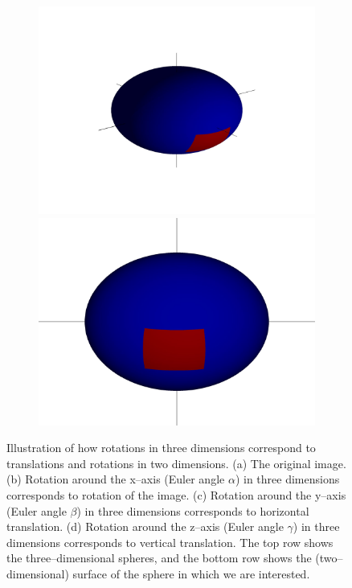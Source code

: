 \documentclass[11pt]{article}
\begin{document}
\begin{figure}
\begin{subfigure}{0.2\textwidth}
\caption{}
\end{subfigure}
\begin{subfigure}{0.2\textwidth}
\includegraphics[width=\textwidth]{sphere_4}
\includegraphics[width=\textwidth]{sphere2_4}
\caption{}
\end{subfigure}
\caption{Illustration of how rotations in three dimensions correspond to translations and rotations in two dimensions. (a) The original image. (b) Rotation around the x--axis (Euler angle $\alpha$) in three dimensions corresponds to rotation of the image. (c) Rotation around the y--axis (Euler angle $\beta$) in three dimensions corresponds to horizontal translation. (d) Rotation around the z--axis (Euler angle $\gamma$) in three dimensions corresponds to vertical translation. The top row shows the three--dimensional spheres, and the bottom row shows the (two--dimensional) surface of the sphere in which we are interested.}
\end{figure}
\end{document}
